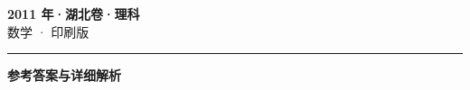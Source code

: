 \documentclass[zihao=5, a4paper]{ctexart}
\begin{document}
\begin{center}
  {\Large\bfseries 2011 年·湖北卷·理科}\\[4pt]
  {\large 数学 · 印刷版}
\end{center}
\medskip
{}

\par\bigskip\hrule\bigskip
{}
\begin{center}{\large\bfseries 参考答案与详细解析}\end{center}
\smallskip

\end{document}
